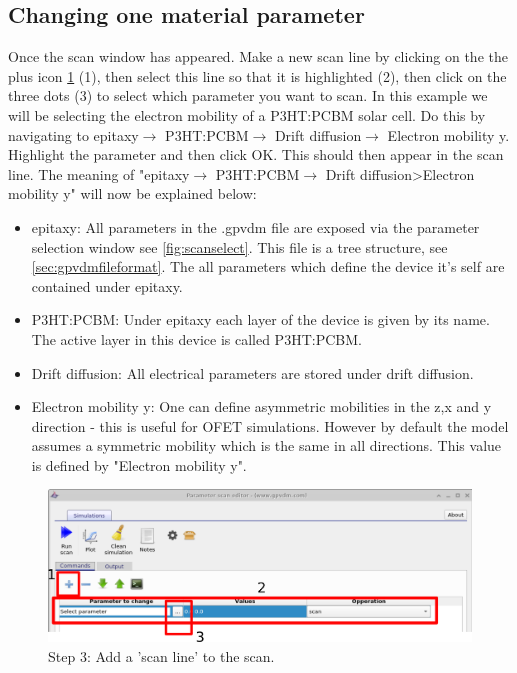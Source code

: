 \subsection{Changing one material parameter}

Once the scan window has appeared. Make a new scan line by clicking on the the plus icon \ref{fig:newscanline} (1), then select this line so that it is highlighted (2), then click on the three dots (3) to select which parameter you want to scan. In this example we will be selecting the electron mobility of a P3HT:PCBM solar cell. Do this by navigating to epitaxy$\rightarrow$ P3HT:PCBM$\rightarrow$ Drift diffusion$\rightarrow$ Electron mobility y. Highlight the parameter and then click OK. This should then appear in the scan line. The meaning of "epitaxy$\rightarrow$ P3HT:PCBM$\rightarrow$ Drift diffusion>Electron mobility y" will now be explained below:

\begin{itemize}
  \item epitaxy: All parameters in the .gpvdm file are exposed via the parameter selection window see \ref{fig:scanselect}. This file is a tree structure, see \ref{sec:gpvdmfileformat}. The all parameters which define the device it's self are contained under epitaxy.
  \item P3HT:PCBM: Under epitaxy each layer of the device is given by its name. The active layer in this device is called P3HT:PCBM.
  \item Drift diffusion: All electrical parameters are stored under drift diffusion.
  \item Electron mobility y: One can define asymmetric mobilities in the z,x and y direction - this is useful for OFET simulations.  However by default the model assumes a symmetric mobility which is the same in all directions. This value is defined by "Electron mobility y". 
\end{itemize}

\begin{figure}[H]
\centering
\includegraphics[width=\textwidth]{./images/param_scan_new_line.png}
\caption{Step 3: Add a 'scan line' to the scan.}
\label{fig:newscanline}
\end{figure}

